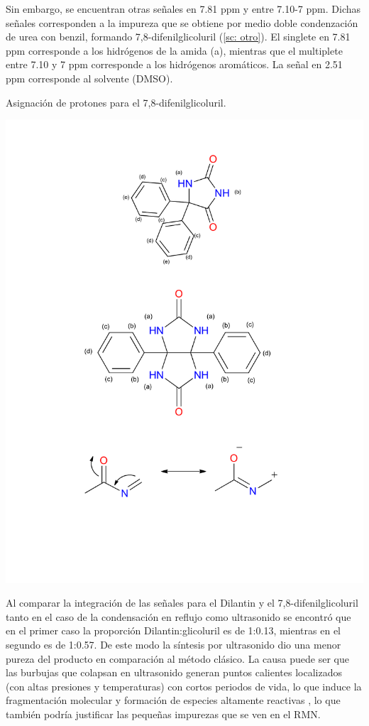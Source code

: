 \documentclass[fleqn,10pt]{SelfArx}
\begin{document}
Sin embargo, se encuentran otras señales en 7.81 ppm y entre 7.10-7 ppm. Dichas señales corresponden a la impureza que se obtiene por medio doble condenzación de urea con benzil, formando 7,8-difenilglicoluril (\autoref{sc: otro}). El singlete en 7.81 ppm corresponde a los hidrógenos de la amida (a), mientras que el multiplete entre 7.10 y 7 ppm corresponde a los hidrógenos aromáticos. La señal en 2.51 ppm corresponde al solvente (DMSO).
\begin{scheme}[h]
	\centering
	\caption{Asignaci\'on de protones para el 7,8-difenilglicoluril.}
	\label{sc: otro}
	\includegraphics[width=0.7\linewidth]{structures/picos2.pdf}
\end{scheme}

\pagebreak
Al comparar la integración de las señales para el Dilantin y el 7,8-difenilglicoluril tanto en el caso de la condensación en reflujo como ultrasonido se encontró que en el primer caso la proporción Dilantin:glicoluril es de 1:0.13, mientras en el segundo es de 1:0.57. De este modo la síntesis por ultrasonido dio una menor pureza del producto en comparación al método clásico. La causa puede ser que las burbujas que colapsan en ultrasonido generan puntos calientes localizados (con altas presiones y temperaturas) con cortos periodos de vida, lo que induce la fragmentación molecular y formación de especies altamente reactivas \cite{li2010}, lo que también podría justificar las pequeñas impurezas que se ven en el RMN.
\end{document}
